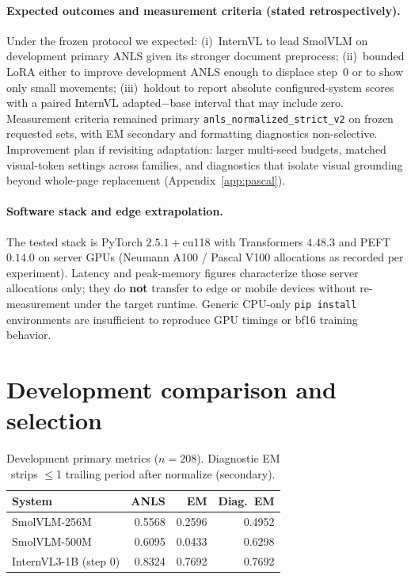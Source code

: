 \documentclass[11pt,a4paper]{article}
\begin{document}
\paragraph{Expected outcomes and measurement criteria (stated retrospectively).}
Under the frozen protocol we expected: (i)~InternVL to lead SmolVLM on development primary ANLS given its stronger document preprocess; (ii)~bounded LoRA either to improve development ANLS enough to displace step~0 or to show only small movements; (iii)~holdout to report absolute configured-system scores with a paired InternVL adapted$-$base interval that may include zero.
Measurement criteria remained primary \texttt{anls\_normalized\_strict\_v2} on frozen requested sets, with EM secondary and formatting diagnostics non-selective.
Improvement plan if revisiting adaptation: larger multi-seed budgets, matched visual-token settings across families, and diagnostics that isolate visual grounding beyond whole-page replacement (Appendix~\ref{app:pascal}).

\paragraph{Software stack and edge extrapolation.}
The tested stack is PyTorch $2.5.1{+}$cu118 with Transformers $4.48.3$ and PEFT $0.14.0$ on server GPUs (Neumann A100 / Pascal V100 allocations as recorded per experiment).
Latency and peak-memory figures characterize those server allocations only; they do \textbf{not} transfer to edge or mobile devices without re-measurement under the target runtime.
Generic CPU-only \texttt{pip install} environments are insufficient to reproduce GPU timings or bf16 training behavior.

\section{Development comparison and selection}

\begin{table}[H]
\centering
\caption{Development primary metrics ($n{=}208$). Diagnostic EM strips $\le$1 trailing period after normalize (secondary).}
\label{tab:dev}
\begin{tabular}{@{}lrrr@{}}
\toprule
System & ANLS & EM & Diag.\ EM \\
\midrule
SmolVLM-256M & 0.5568 & 0.2596 & 0.4952 \\
SmolVLM-500M & 0.6095 & 0.0433 & 0.6298 \\
InternVL3-1B (step 0) & 0.8324 & 0.7692 & 0.7692 \\
\bottomrule
\end{tabular}
\end{table}
\end{document}
